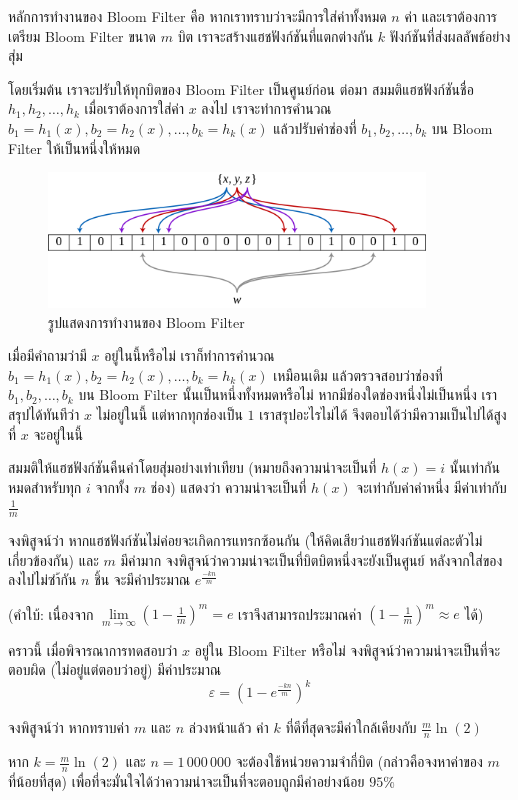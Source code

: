 หลักการทำงานของ Bloom Filter คือ หากเราทราบว่าจะมีการใส่ค่าทั้งหมด $n$ ค่า และเราต้องการเตรียม Bloom Filter ขนาด $m$ บิต เราจะสร้างแฮชฟังก์ชันที่แตกต่างกัน $k$ ฟังก์ชันที่ส่งผลลัพธ์อย่างสุ่ม

โดยเริ่มต้น เราจะปรับให้ทุกบิตของ Bloom Filter เป็นศูนย์ก่อน ต่อมา สมมติแฮชฟังก์ชันชื่อ $h_1, h_2, \dots, h_k$ เมื่อเราต้องการใส่ค่า $x$ ลงไป เราจะทำการคำนวณ $b_1 = h_1(x), b_2 = h_2(x), \dots, b_k = h_k(x)$ แล้วปรับค่าช่องที่ $b_1, b_2, \dots, b_k$ บน Bloom Filter ให้เป็นหนึ่งให้หมด

\begin{figure}[htbp]
    \centering
    \includegraphics[width=10cm]{chapters/bloomfilter.png}
    \caption{รูปแสดงการทำงานของ Bloom Filter}
    \label{fig:bloom_filter}
\end{figure}

เมื่อมีคำถามว่ามี $x$ อยู่ในนี้หรือไม่ เราก็ทำการคำนวณ $b_1 = h_1(x), b_2 = h_2(x), \dots, b_k = h_k(x)$ เหมือนเดิม แล้วตรวจสอบว่าช่องที่ $b_1, b_2, \dots, b_k$ บน Bloom Filter นั้นเป็นหนึ่งทั้งหมดหรือไม่ หากมีช่องใดช่องหนึ่งไม่เป็นหนึ่ง เราสรุปได้ทันทีว่า $x$ ไม่อยู่ในนี้ แต่หากทุกช่องเป็น $1$ เราสรุปอะไรไม่ได้ จึงตอบได้ว่ามีความเป็นไปได้สูงที่ $x$ จะอยู่ในนี้

สมมติให้แฮชฟังก์ชันคืนค่าโดยสุ่มอย่างเท่าเทียบ (หมายถึงความน่าจะเป็นที่ $h(x) = i$ นั้นเท่ากันหมดสำหรับทุก $i$ จากทั้ง $m$ ช่อง) แสดงว่า ความน่าจะเป็นที่ $h(x)$ จะเท่ากับค่าค่าหนึ่ง มีค่าเท่ากับ $\frac{1}{m}$ 

\begin{exercise}
จงพิสูจน์ว่า หากแฮชฟังก์ชันไม่ค่อยจะเกิดการแทรกซ้อนกัน (ให้คิดเสียว่าแฮชฟังก์ชันแต่ละตัวไม่เกี่ยวข้องกัน) และ $m$ มีค่ามาก จงพิสูจน์ว่าความน่าจะเป็นที่บิตบิตหนึ่งจะยังเป็นศูนย์ หลังจากใส่ของลงไปไม่ซำ้กัน $n$ ชิ้น จะมีค่าประมาณ $e^\frac{-kn}{m}$

(คำใบ้: เนื่องจาก $\lim\limits_{m \to \infty} \left(1-\frac{1}{m}\right)^m = e$ เราจึงสามารถประมาณค่า $\left(1-\frac{1}{m}\right)^m \approx e$ ได้)
\end{exercise}

\begin{exercise}
คราวนี้ เมื่อพิจารณาการทดสอบว่า $x$ อยู่ใน Bloom Filter หรือไม่ จงพิสูจน์ว่าความน่าจะเป็นที่จะตอบผิด (ไม่อยู่แต่ตอบว่าอยู่) มีค่าประมาณ
\[
\varepsilon = (1-e^\frac{-kn}{m})^k
\]
\end{exercise}

\begin{exercise}
จงพิสูจน์ว่า หากทราบค่า $m$ และ $n$ ล่วงหน้าแล้ว ค่า $k$ ที่ดีที่สุดจะมีค่าใกล้เคียงกับ $\frac{m}{n} \ln(2)$
\end{exercise}

\begin{exercise}
หาก $k = \frac{m}{n} \ln(2)$ และ $n = 1\,000\,000$ จะต้องใช้หน่วยความจำกี่บิต (กล่าวคือจงหาค่าของ $m$ ที่น้อยที่สุด) เพื่อที่จะมั่นใจได้ว่าความน่าจะเป็นที่จะตอบถูกมีค่าอย่างน้อย $95\%$
\end{exercise}